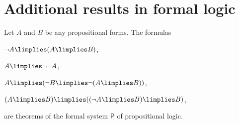 
\section{Additional results in formal logic}

\begin{lemma}
Let $A$ and $B$ be any propositional forms. The formulas
\begin{statements}
\item \label{pcl1} $\lnot A \limplies (A \limplies B)$,
\item \label{pcl2} $A \limplies \lnot\lnot A$,
\item \label{pcl3} $A \limplies (\lnot B \limplies \lnot (A\limplies B))$,
\item \label{pcl4} $(A\limplies B) \limplies ( (\lnot A \limplies B) \limplies B)$,
\end{statements}
are theorems of the formal system $\mathsf{P}$ of propositional logic.
\label{pcl}
\end{lemma}

